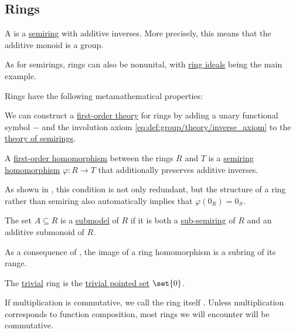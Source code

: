 \subsection{Rings}\label{subsec:rings}

\begin{definition}\label{def:ring}
  A  is a \hyperref[def:semiring]{semiring} with additive inverses. More precisely, this means that the additive monoid is a group.

  As for semirings, rings can also be nonunital, with \hyperref[def:semiring_ideal]{ring ideals} being the main example.

  Rings have the following metamathematical properties:
  \begin{thmenum}
     We can construct a \hyperref[def:first_order_theory]{first-order theory} for rings by adding a unary functional symbol \( - \) and the involution axiom \eqref{eq:def:group/theory/inverse_axiom} to the \hyperref[def:semiring/theory]{theory of semirings}.

     A \hyperref[def:first_order_homomorphism]{first-order homomorphism} between the rings \( R \) and \( T \) is a \hyperref[def:semiring/homomorphism]{semiring homomorphism} \( \varphi: R \to T \) that additionally preserves additive inverses.

    As shown in , this condition is not only redundant, but the structure of a ring rather than semiring also automatically implies that \( \varphi(0_R) = 0_S \).

     The set \( A \subseteq R \) is a \hyperref[thm:substructure_is_model]{submodel} of \( R \) if it is both a \hyperref[def:semiring]{sub-semiring} of \( R \) and an additive submonoid of \( R \).

    As a consequence of , the image of a ring homomorphism is a subring of its range.

     The \hyperref[thm:substructures_form_complete_lattice/bottom]{trivial} ring is the \hyperref[def:pointed_set/trivial]{trivial pointed set} \( \set{ 0 } \).

     If multiplication is commutative, we call the ring itself . Unless multiplication corresponds to function composition, most rings we will encounter will be commutative.


\end{thmenum}
\end{definition}
